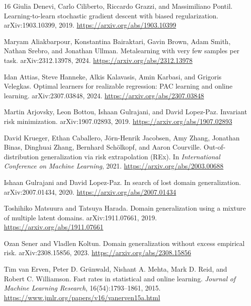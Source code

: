 \documentclass[11pt]{article}
\theoremstyle{definition}
\begin{document}
\begin{thebibliography}{16}
Giulia Denevi, Carlo Ciliberto, Riccardo Grazzi, and Massimiliano Pontil.
\newblock Learning-to-learn stochastic gradient descent with biased regularization.
\newblock arXiv:1903.10399, 2019.
\newblock \url{https://arxiv.org/abs/1903.10399}

Maryam Aliakbarpour, Konstantina Bairaktari, Gavin Brown, Adam Smith, Nathan Srebro, and Jonathan Ullman.
\newblock Metalearning with very few samples per task.
\newblock arXiv:2312.13978, 2024.
\newblock \url{https://arxiv.org/abs/2312.13978}

Idan Attias, Steve Hanneke, Alkis Kalavasis, Amin Karbasi, and Grigoris Velegkas.
\newblock Optimal learners for realizable regression: PAC learning and online learning.
\newblock arXiv:2307.03848, 2024.
\newblock \url{https://arxiv.org/abs/2307.03848}

Martin Arjovsky, Leon Bottou, Ishaan Gulrajani, and David Lopez-Paz.
\newblock Invariant risk minimization.
\newblock arXiv:1907.02893, 2019.
\newblock \url{https://arxiv.org/abs/1907.02893}

David Krueger, Ethan Caballero, J\"orn-Henrik Jacobsen, Amy Zhang, Jonathan Binas, Dinghuai Zhang, Bernhard Sch\"olkopf, and Aaron Courville.
\newblock Out-of-distribution generalization via risk extrapolation (REx).
\newblock In \emph{International Conference on Machine Learning}, 2021.
\newblock \url{https://arxiv.org/abs/2003.00688}

Ishaan Gulrajani and David Lopez-Paz.
\newblock In search of lost domain generalization.
\newblock arXiv:2007.01434, 2020.
\newblock \url{https://arxiv.org/abs/2007.01434}

Toshihiko Matsuura and Tatsuya Harada.
\newblock Domain generalization using a mixture of multiple latent domains.
\newblock arXiv:1911.07661, 2019.
\newblock \url{https://arxiv.org/abs/1911.07661}

Ozan Sener and Vladlen Koltun.
\newblock Domain generalization without excess empirical risk.
\newblock arXiv:2308.15856, 2023.
\newblock \url{https://arxiv.org/abs/2308.15856}

Tim van Erven, Peter D. Gr\"unwald, Nishant A. Mehta, Mark D. Reid, and Robert C. Williamson.
\newblock Fast rates in statistical and online learning.
\newblock \emph{Journal of Machine Learning Research}, 16(54):1793--1861, 2015.
\newblock \url{https://www.jmlr.org/papers/v16/vanerven15a.html}

\end{thebibliography}
\end{document}
